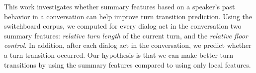 This work investigates whether summary features based on a speaker's past behavior in a conversation can help improve turn transition prediction.
Using the switchboard corpus, we computed for every dialog act in the conversation two summary features: \textit{relative turn length} of the current turn, and the \textit{relative floor control}.
In addition, after each dialog act in the conversation, we predict whether a turn transition occurred. Our hypothesis is that we can make better
turn transitions by using the summary features compared to using only local features.
